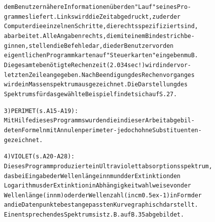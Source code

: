 \documentclass[a4paper,11pt]{article}
\begin{document}
\begin{alltt}
   dem Benutzer nähere Informationen über den "Lauf" seines Pro-
   grammes liefert. Links wird die Zeit abgedruckt, zu der der
   Computer die einzelnen Schritte, die rechts spezifiziert sind,
   abarbeitet. Alle Angaben rechts, die mit einem Bindestrich be-
   ginnen, stellen die Befehle dar, die der Benutzer vor den
   eigentlichen Programmkarten auf "Steuerkarten" eingeben muB.
   Die gesamte benötigte Rechenzeit (2.034 sec!) wird in der vor-
   letzten Zeile angegeben. Nach Beendigung des Rechenvorganges
   wird ein Massenspektrum ausgezeichnet. Die Darstellung des
   Spektrums für das gewählte Beispiel findet sich auf S. 27.

3) PERIMET (s. A 15 - A 19):
   Mit Hilfe dieses Programms wurden die in dieser Arbeit abgebil-
   deten Formeln mit Annulenperimeter - jedoch ohne Substituenten -
   gezeichnet.

4) VIOLET (s. A 20 - A 28):
   Dieses Programm produziert ein Ultraviolettabsorptionsspektrum‚
   das bei Eingabe der Wellenlänge in nm und der Extinktion den
   Logarithmus der Extinktion in Abhängigkeit wahlweise von der
   Wellenlänge (in nm) oder der Wellenzahl (in cm\raise0.5ex\hbox{-1}) in Form der
   an die Datenpunkte best angepassten Kurve graphisch darstellt.
   Ein entsprechendes Spektrums ist z.B. auf B. 35 abgebildet.
\newpage\singlespacing
{}


\end{alltt}
\end{document}
